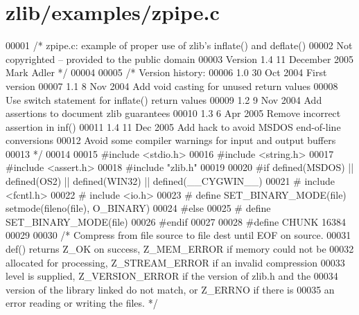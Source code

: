 \hypertarget{zlib_2examples_2zpipe_8c_source}{}\section{zlib/examples/zpipe.c}
\label{zlib_2examples_2zpipe_8c_source}

\begin{DoxyCode}
00001 \textcolor{comment}{/* zpipe.c: example of proper use of zlib's inflate() and deflate()}
00002 \textcolor{comment}{   Not copyrighted -- provided to the public domain}
00003 \textcolor{comment}{   Version 1.4  11 December 2005  Mark Adler */}
00004 
00005 \textcolor{comment}{/* Version history:}
00006 \textcolor{comment}{   1.0  30 Oct 2004  First version}
00007 \textcolor{comment}{   1.1   8 Nov 2004  Add void casting for unused return values}
00008 \textcolor{comment}{                     Use switch statement for inflate() return values}
00009 \textcolor{comment}{   1.2   9 Nov 2004  Add assertions to document zlib guarantees}
00010 \textcolor{comment}{   1.3   6 Apr 2005  Remove incorrect assertion in inf()}
00011 \textcolor{comment}{   1.4  11 Dec 2005  Add hack to avoid MSDOS end-of-line conversions}
00012 \textcolor{comment}{                     Avoid some compiler warnings for input and output buffers}
00013 \textcolor{comment}{ */}
00014 
00015 \textcolor{preprocessor}{#include <stdio.h>}
00016 \textcolor{preprocessor}{#include <string.h>}
00017 \textcolor{preprocessor}{#include <assert.h>}
00018 \textcolor{preprocessor}{#include "zlib.h"}
00019 
00020 \textcolor{preprocessor}{#if defined(MSDOS) || defined(OS2) || defined(WIN32) || defined(\_\_CYGWIN\_\_)}
00021 \textcolor{preprocessor}{#  include <fcntl.h>}
00022 \textcolor{preprocessor}{#  include <io.h>}
00023 \textcolor{preprocessor}{#  define SET\_BINARY\_MODE(file) setmode(fileno(file), O\_BINARY)}
00024 \textcolor{preprocessor}{#else}
00025 \textcolor{preprocessor}{#  define SET\_BINARY\_MODE(file)}
00026 \textcolor{preprocessor}{#endif}
00027 
00028 \textcolor{preprocessor}{#define CHUNK 16384}
00029 
00030 \textcolor{comment}{/* Compress from file source to file dest until EOF on source.}
00031 \textcolor{comment}{   def() returns Z\_OK on success, Z\_MEM\_ERROR if memory could not be}
00032 \textcolor{comment}{   allocated for processing, Z\_STREAM\_ERROR if an invalid compression}
00033 \textcolor{comment}{   level is supplied, Z\_VERSION\_ERROR if the version of zlib.h and the}
00034 \textcolor{comment}{   version of the library linked do not match, or Z\_ERRNO if there is}
00035 \textcolor{comment}{   an error reading or writing the files. */}

\end{DoxyCode}
